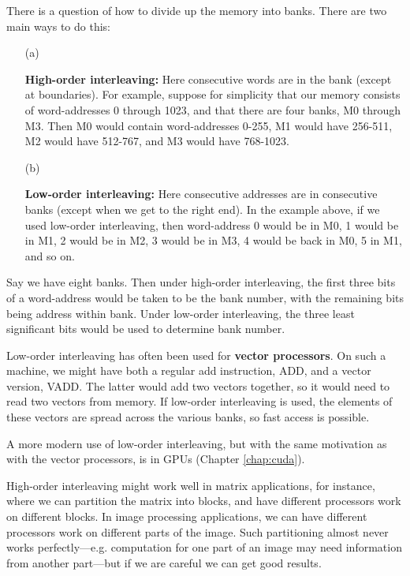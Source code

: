 There is a question of how to divide up the memory into banks.
There are two main ways to do this:

\begin{itemize}

\item [(a)]

{\bf High-order interleaving:} Here consecutive words are in the
 bank (except at boundaries). For example, suppose for
simplicity that our memory consists of word-addresses 0 through 1023,
and that there are four banks, M0 through M3.  Then M0 would contain
word-addresses 0-255, M1 would have 256-511, M2 would have 512-767, and
M3 would have 768-1023.

\item [(b)]

{\bf Low-order interleaving:} Here consecutive addresses are in
consecutive banks (except when we get to the right end). In the
example above, if we used low-order interleaving, then word-address 0
would be in M0, 1 would be in M1, 2 would be in M2, 3 would be in M3, 4
would be back in M0, 5 in M1, and so on.

\end{itemize}

Say we have eight banks.  Then under high-order interleaving, the first
three bits of a word-address would be taken to be the bank number, with
the remaining bits being address within bank.  Under low-order
interleaving, the three least significant bits would be used to determine
bank number.

Low-order interleaving has often been used for {\bf vector processors}.
On such a machine, we might have both a regular add instruction, ADD,
and a vector version, VADD.  The latter would add two vectors together,
so it would need to read two vectors from memory.  If low-order
interleaving is used, the elements of these vectors are spread across
the various banks, so fast access is possible.

A more modern use of low-order interleaving, but with the same
motivation as with the vector processors, is in GPUs (Chapter
\ref{chap:cuda}).

High-order interleaving might work well in matrix applications, for
instance, where we can partition the matrix into blocks, and have
different processors work on different blocks.  In image processing
applications, we can have different processors work on different parts
of the image.  Such partitioning almost never works perfectly---e.g.
computation for one part of an image may need information from another
part---but if we are careful we can get good results.

